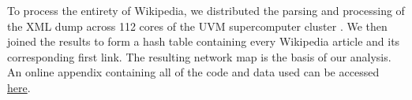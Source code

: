 \documentclass[pre,twocolumn,twoside,superscriptaddress,floatfix, aps, 10pt]{revtex4-1}
\begin{document}
To process the entirety of Wikipedia, we distributed the parsing and processing of the XML dump
across 112 cores of the UVM supercomputer cluster
\cite{vacc}.
We then joined the results to form a hash table containing every Wikipedia article and its corresponding
first link. The resulting network map is the basis of our analysis.
An online appendix containing all of the code and data used can be accessed \href{http://compstorylab.org/share/papers/ibrahim2016a/index.html}{here}.



{}

\end{document}
